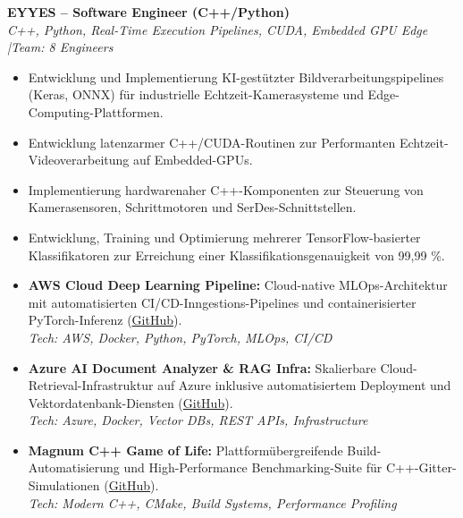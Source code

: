 \documentclass[10pt,a4paper]{article}
\begin{document}
\vspace{0.15cm}
\textbf{EYYES -- Software Engineer (C++/Python)} \\
\textit{C++, Python, Real-Time Execution Pipelines, CUDA, Embedded GPU Edge \quad|\quad Team: 8 Engineers}
\begin{itemize}
    \item Entwicklung und Implementierung KI-gestützter Bildverarbeitungspipelines (Keras, ONNX) für industrielle Echtzeit-Kamerasysteme und Edge-Computing-Plattformen.
    \item Entwicklung latenzarmer C++/CUDA-Routinen zur Performanten Echtzeit-Videoverarbeitung auf Embedded-GPUs.
    \item Implementierung hardwarenaher C++-Komponenten zur Steuerung von Kamerasensoren, Schrittmotoren und SerDes-Schnittstellen.
    \item Entwicklung, Training und Optimierung mehrerer TensorFlow-basierter Klassifikatoren zur Erreichung einer Klassifikationsgenauigkeit von 99,99 \%.
\end{itemize}


\begin{itemize}[leftmargin=1.5em, itemsep=0.2em]
    \item \textbf{AWS Cloud Deep Learning Pipeline:} Cloud-native MLOps-Architektur mit automatisierten CI/CD-Inngestions-Pipelines und containerisierter PyTorch-Inferenz (\href{https://github.com/CodeByMaxx/aws-pneumonia-detection}{GitHub}).\\
    \textit{Tech: AWS, Docker, Python, PyTorch, MLOps, CI/CD}
    \item \textbf{Azure AI Document Analyzer \& RAG Infra:} Skalierbare Cloud-Retrieval-Infrastruktur auf Azure inklusive automatisiertem Deployment und Vektordatenbank-Diensten (\href{https://github.com/CodeByMaxx/AI-Document-Analyzer}{GitHub}).\\
    \textit{Tech: Azure, Docker, Vector DBs, REST APIs, Infrastructure}
    \item \textbf{Magnum C++ Game of Life:} Plattformübergreifende Build-Automatisierung und High-Performance Benchmarking-Suite für C++-Gitter-Simulationen (\href{https://github.com/CodeByMaxx/magnum-game-of-life}{GitHub}).\\
    \textit{Tech: Modern C++, CMake, Build Systems, Performance Profiling}
\end{itemize}
\end{document}

